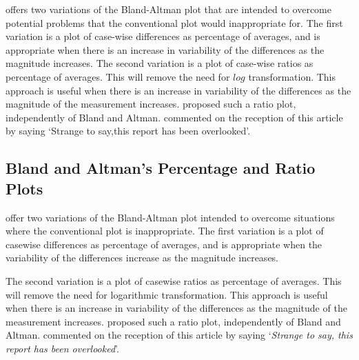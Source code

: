 \documentclass[12pt, a4paper]{report}
\theoremstyle{plain}
\theoremstyle{definition}
\theoremstyle{remark}
\begin{document}
\citet{BA99} offers two variations of the Bland-Altman plot that are intended to overcome potential problems that the conventional
plot would inappropriate for. The first variation is a plot of case-wise differences as percentage of averages, and is
appropriate when there is an increase in variability of the differences as the magnitude increases. The second variation is a
plot of case-wise ratios as percentage of averages. This will remove the need for $log$ transformation. This approach is useful
when there is an increase in variability of the differences as the magnitude of the measurement increases. \citet{Eksborg} proposed
such a ratio plot, independently of Bland and Altman. \citet{Dewitte} commented on the reception of this article by saying `Strange to say,this report has been overlooked'.
	\subsection*{Bland and Altman's Percentage and Ratio Plots}
	\citet{BA99} offer two variations of the Bland-Altman plot intended to overcome situations where the conventional plot is inappropriate. The first variation is a plot of casewise differences as percentage of averages, and is appropriate when the variability of the differences increase as the
	magnitude increases. 
	
	The second variation is a plot of casewise ratios as percentage of averages. This will remove the need for
	logarithmic transformation. This approach is useful when there is an increase in variability of the differences as the magnitude of the measurement increases. \citet{Eksborg} proposed such a ratio plot,
	independently of Bland and Altman. \citet{Dewitte} commented on
	the reception of this article by saying `\textit{Strange to say, this 
		report has been overlooked}'.
	
	
	
\end{document}
